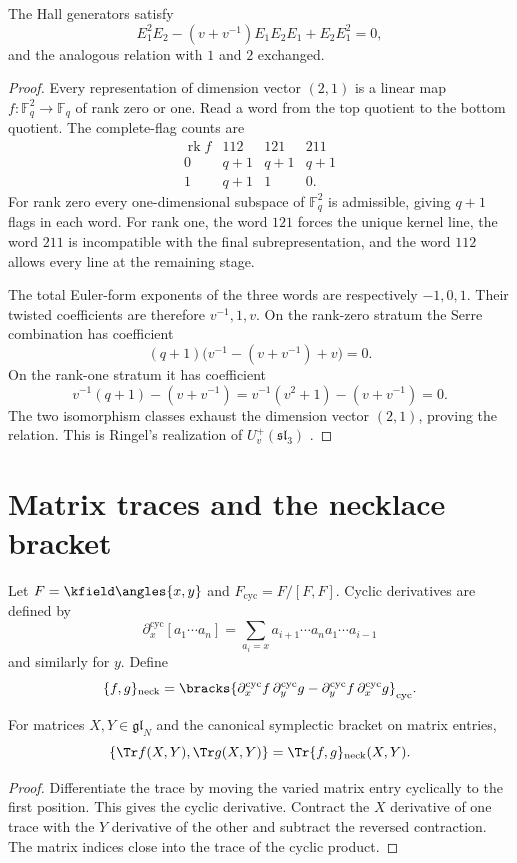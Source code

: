 \begin{theorem}
The Hall generators satisfy
\[
 E_1^2E_2-(v+v^{-1})E_1E_2E_1+E_2E_1^2=0,
\]
and the analogous relation with $1$ and $2$ exchanged.
\end{theorem}
\begin{proof}
Every representation of dimension vector $(2,1)$ is a linear map $f:\mathbb F_q^2\to\mathbb F_q$ of rank zero or one. Read a word from the top quotient to the bottom quotient. The complete-flag counts are
\[
\begin{array}{c|ccc}
\operatorname{rk}f&112&121&211\\ \hline
0&q+1&q+1&q+1\\
1&q+1&1&0.
\end{array}
\]
For rank zero every one-dimensional subspace of $\mathbb F_q^2$ is admissible, giving $q+1$ flags in each word. For rank one, the word $121$ forces the unique kernel line, the word $211$ is incompatible with the final subrepresentation, and the word $112$ allows every line at the remaining stage.

The total Euler-form exponents of the three words are respectively $-1,0,1$. Their twisted coefficients are therefore $v^{-1},1,v$. On the rank-zero stratum the Serre combination has coefficient
\[
 (q+1)\bigl(v^{-1}-(v+v^{-1})+v\bigr)=0.
\]
On the rank-one stratum it has coefficient
\[
 v^{-1}(q+1)-(v+v^{-1})
 =v^{-1}(v^2+1)-(v+v^{-1})=0.
\]
The two isomorphism classes exhaust the dimension vector $(2,1)$, proving the relation. This is Ringel's realization of $U_v^+(\mathfrak{sl}_3)$ \cite{Ringel,Green}.
\end{proof}

\chapter{Matrix traces and the necklace bracket}
Let $F=\kfield\angles{x,y}$ and $F_{\mathrm{cyc}}=F/[F,F]$. Cyclic derivatives are defined by
\[
 \partial_x^{\mathrm{cyc}}[a_1\cdots a_n]
 =\sum_{a_i=x}a_{i+1}\cdots a_na_1\cdots a_{i-1}
\]
and similarly for $y$. Define
\[
 \{f,g\}_{\mathrm{neck}}
 =\bracks{
 \partial_x^{\mathrm{cyc}}f\,\partial_y^{\mathrm{cyc}}g
 -\partial_y^{\mathrm{cyc}}f\,\partial_x^{\mathrm{cyc}}g}_{\mathrm{cyc}}.
\]

\begin{theorem}
For matrices $X,Y\in\mathfrak{gl}_N$ and the canonical symplectic bracket on matrix entries,
\[
 \{\Tr f(X,Y),\Tr g(X,Y)\}
 =\Tr\{f,g\}_{\mathrm{neck}}(X,Y).
\]
\end{theorem}
\begin{proof}
Differentiate the trace by moving the varied matrix entry cyclically to the first position. This gives the cyclic derivative. Contract the $X$ derivative of one trace with the $Y$ derivative of the other and subtract the reversed contraction. The matrix indices close into the trace of the cyclic product.
\end{proof}

